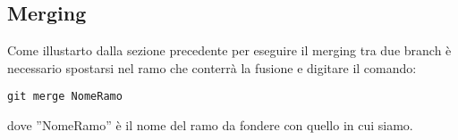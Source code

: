 \subsection{Merging}
Come illustarto dalla sezione precedente per eseguire il merging tra due branch è necessario spostarsi nel ramo che conterrà la fusione e digitare il comando:

\begin{center}
\texttt{git merge NomeRamo}
\end{center}

dove ''NomeRamo'' è il nome del ramo da fondere con quello in cui siamo.
